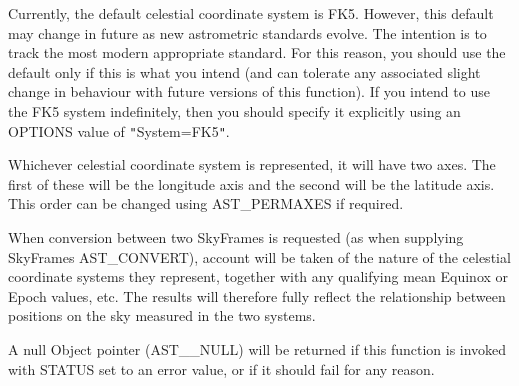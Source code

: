 \documentclass[twoside,11pt]{article}
\newcommand{\htmlref}[2]{#1}
\begin{document}
{{{         \sstitem
         Currently, the default celestial coordinate system is
         FK5. However, this default may change in future as new
         astrometric standards evolve. The intention is to track the most
         modern appropriate standard. For this reason, you should use the
         default only if this is what you intend (and can tolerate any
         associated slight change in behaviour with future versions of
         this function). If you intend to use the FK5 system
         indefinitely, then you should specify it explicitly using an
         OPTIONS value of {\tt{"}}System=FK5{\tt{"}}.

         \sstitem
         Whichever celestial coordinate system is represented, it will
         have two axes.  The first of these will be the longitude axis
         and the second will be the latitude axis. This order can be
         changed using \htmlref{AST\_PERMAXES}{AST_PERMAXES} if required.

         \sstitem
         When conversion between two SkyFrames is requested (as when
         supplying SkyFrames \htmlref{AST\_CONVERT}{AST_CONVERT}),
         account will be taken of the nature of the celestial coordinate
         systems they represent, together with any qualifying mean Equinox or
         Epoch values, etc. The results will therefore fully reflect the
         relationship between positions on the sky measured in the two
         systems.

         \sstitem
         A null \htmlref{Object}{Object} pointer (AST\_\_NULL) will be returned if this
         function is invoked with STATUS set to an error value, or if it
         should fail for any reason.
      }
   }
}
\end{document}
